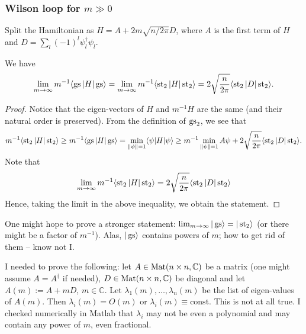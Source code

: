\subsubsection{Wilson loop for $m \gg 0$}
Split the Hamiltonian as $H = A + 2m\sqrt{n/2\pi} D$, where $A$ is the first term of $H$ and $D = \sum_l (-1)^l \psi_l^\dagger \psi_l$.
\begin{statement}
We have 
\[
\lim_{m \rightarrow \infty}m^{-1} \langle \operatorname{gs} | H| \operatorname{gs}\rangle = \lim_{m \rightarrow \infty} m^{-1}\langle \operatorname{st}_2 | H| \operatorname{st}_2 \rangle =  2\sqrt{\frac{n}{2\pi}} \langle \operatorname{st}_2 | D| \operatorname{st}_2\rangle.
\]
\end{statement}
\begin{proof}
Notice that the eigen-vectors of $H$ and $m^{-1}H$ are the same (and their natural order is preserved). From the definition of $\operatorname{gs}_2$, we see that
\[
m^{-1}\langle \operatorname{st}_2 | H| \operatorname{st}_2 \rangle \geq m^{-1}\langle \operatorname{gs} | H| \operatorname{gs} \rangle = \min_{\|\psi\|=1} \langle \psi |H|\psi\rangle \geq m^{-1}\min_{\|\psi\|=1} A\psi + 2\sqrt{\frac{n}{2\pi}} \langle \operatorname{st}_2 | D| \operatorname{st}_2\rangle.
\]
Note that 
\[
\lim_{m\rightarrow \infty} m^{-1}\langle \operatorname{st}_2 | H|\operatorname{st}_2 \rangle = 2\sqrt{\frac{n}{2\pi}} \langle \operatorname{st}_2 | D| \operatorname{st}_2\rangle
\]
Hence, taking the limit in the above inequality, we obtain the statement.
\end{proof}
\begin{quest}
One might hope to prove a stronger statement: $\lim_{m \rightarrow \infty}|\operatorname{gs}\rangle = |\operatorname{st}_2\rangle$ (or there might be a factor of $m^{-1}$). Alas, $|\operatorname{gs}\rangle$ contains powers of $m$; how to get rid of them -- know not I.
\end{quest}
\begin{wrong}
I needed to prove the following: let $A \in \operatorname{Mat}(n\times n,\mathbb C)$ be a matrix (one might assume $A = A^\dagger$ if needed), $D \in \operatorname{Mat}(n\times n,\mathbb C)$ be diagonal and let $A(m) := A + mD$, $m \in \mathbb C$. Let $\lambda_1(m),\ldots,\lambda_n(m)$ be the list of eigen-values of $A(m)$. Then $\lambda_i(m) = O(m)$ or $\lambda_i(m) \equiv \text{const}$. This is not at all true. I checked numerically in Matlab that $\lambda_i$ may not be even a polynomial and may contain any power of $m$, even fractional.
\end{wrong}

